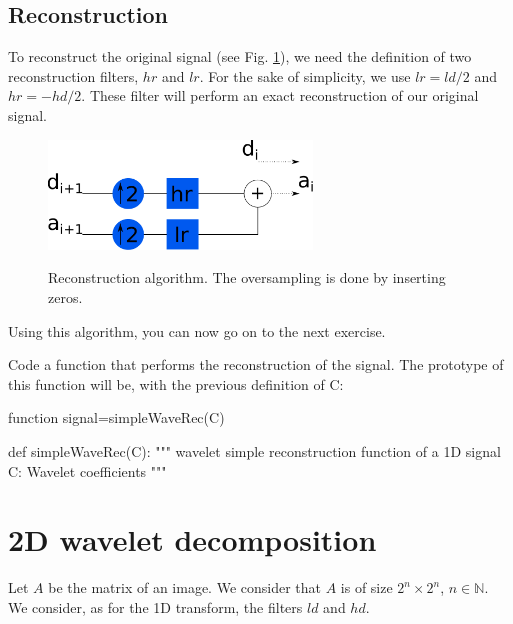 \subsection{Reconstruction}
To reconstruct the original signal (see Fig. \ref{fig:wavelets:reconstruction}), we need the definition of two reconstruction filters, $hr$ 
and $lr$. For the sake of simplicity, we use $lr=ld/2$ and $hr=-hd/2$. These filter will perform an exact reconstruction of our original 
signal.

\begin{figure}[H]
 \centering\caption{Reconstruction algorithm. The oversampling is done by inserting zeros.}
 \includegraphics[width=7cm]{schema_reconstruction.pdf}%
 \label{fig:wavelets:reconstruction}%
\end{figure}

Using this algorithm, you can now go on to the next exercise.

\begin{qbox}
Code a function that performs the reconstruction of the signal. The prototype of this function will be, with the previous definition of C:
\begin{mcomment}
\begin{matlab} 
function signal=simpleWaveRec(C)
\end{matlab}
\end{mcomment}

\begin{pcomment}
\begin{python}
def simpleWaveRec(C):    
    """
    wavelet simple reconstruction function of a 1D signal
    C: Wavelet coefficients 
    """
\end{python}
\end{pcomment}
\end{qbox}

\section{2D wavelet decomposition}
Let $A$ be the matrix of an image. We consider that $A$ is of size $2^n\times 2^n$, $n\in\mathbb{N}$. We consider, as for the 1D transform, 
the filters $ld$ and $hd$.

